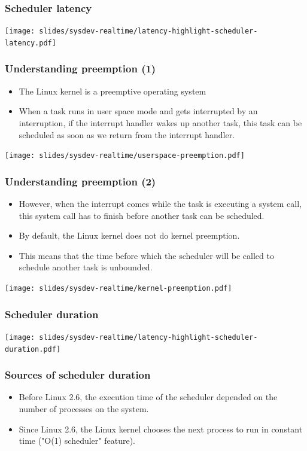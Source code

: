 \begin{frame}
  \frametitle{Scheduler latency}
  \begin{center}
    \texttt{[image: slides/sysdev-realtime/latency-highlight-scheduler-latency.pdf]}
  \end{center}
\end{frame}

\begin{frame}
  \frametitle{Understanding preemption (1)}
  \begin{itemize}
  \item The Linux kernel is a preemptive operating system
  \item When a task runs in user space mode and gets interrupted by an
    interruption, if the interrupt handler wakes up another task, this
    task can be scheduled as soon as we return from the interrupt
    handler.
  \end{itemize}
  \begin{center}
    \texttt{[image: slides/sysdev-realtime/userspace-preemption.pdf]}
  \end{center}
\end{frame}

\begin{frame}
  \frametitle{Understanding preemption (2)}
  \begin{itemize}
  \item However, when the interrupt comes while the task is executing
    a system call, this system call has to finish before another task
    can be scheduled.
  \item By default, the Linux kernel does not do kernel preemption.
  \item This means that the time before which the scheduler will be
    called to schedule another task is unbounded.
  \end{itemize}
  \begin{center}
    \texttt{[image: slides/sysdev-realtime/kernel-preemption.pdf]}
  \end{center}
\end{frame}

\begin{frame}
\frametitle{Scheduler duration}
  \begin{center}
    \texttt{[image: slides/sysdev-realtime/latency-highlight-scheduler-duration.pdf]}
  \end{center}
\end{frame}

\begin{frame}
  \frametitle{Sources of scheduler duration}
  \begin{itemize}
     \item Before Linux 2.6, the execution time of the scheduler
	   depended on the number of processes on the system.
     \item Since Linux 2.6, the Linux kernel chooses the
	   next process to run in constant time ("O(1) scheduler"
           feature).
  \end{itemize}
\end{frame}

